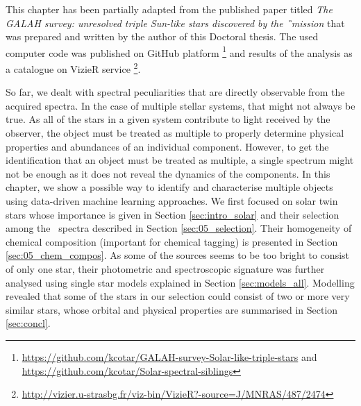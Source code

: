 This chapter has been partially adapted from the published paper titled \textit{The GALAH survey: unresolved triple Sun-like stars discovered by the \G\ mission} \cite{2019MNRAS.487.2474C} that was prepared and written by the author of this Doctoral thesis. The used computer code was published on GitHub platform  \footnote{\url{https://github.com/kcotar/GALAH-survey-Solar-like-triple-stars} and \url{https://github.com/kcotar/Solar-spectral-siblings}} and results of the analysis as a catalogue on VizieR service  \footnote{\url{http://vizier.u-strasbg.fr/viz-bin/VizieR?-source=J/MNRAS/487/2474}}.

So far, we dealt with spectral peculiarities that are directly observable from the acquired spectra. In the case of multiple stellar systems, that might not always be true. As all of the stars in a given system contribute to light received by the observer, the object must be treated as multiple to properly determine physical properties and abundances of an individual component. However, to get the identification that an object must be treated as multiple, a single spectrum might not be enough as it does not reveal the dynamics of the components. In this chapter, we show a possible way to identify and characterise multiple objects using data-driven machine learning approaches. We first focused on solar twin stars whose importance is given in Section \ref{sec:intro_solar} and their selection among the \Gh\ spectra described in Section \ref{sec:05_selection}. Their homogeneity of chemical composition (important for chemical tagging) is presented in Section \ref{sec:05_chem_compos}. As some of the sources seems to be too bright to consist of only one star, their photometric and spectroscopic signature was further analysed using single star models explained in Section \ref{sec:models_all}. Modelling revealed that some of the stars in our selection could consist of two or more very similar stars, whose orbital and physical properties are summarised in Section \ref{sec:concl}. 
 

